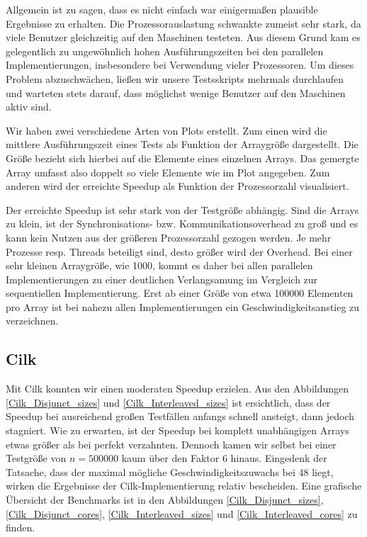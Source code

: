 Allgemein ist zu sagen, dass es nicht einfach war einigermaßen plausible Ergebnisse zu erhalten.
Die Prozessorauslastung schwankte zumeist sehr stark, da viele Benutzer gleichzeitig auf den Maschinen testeten.
Aus diesem Grund kam es gelegentlich zu ungewöhnlich hohen Ausführungszeiten bei den parallelen Implementierungen, insbesondere bei Verwendung vieler Prozessoren.
Um dieses Problem abzuschwächen, ließen wir unsere Testsskripts mehrmals durchlaufen und warteten stets darauf, dass möglichst wenige Benutzer auf den Maschinen aktiv sind.

Wir haben zwei verschiedene Arten von Plots erstellt.
Zum einen wird die mittlere Ausführungszeit eines Tests als Funktion der Arraygröße dargestellt.
Die Größe bezieht sich hierbei auf die Elemente eines einzelnen Arrays.
Das gemergte Array umfasst also doppelt so viele Elemente wie im Plot angegeben.
Zum anderen wird der erreichte Speedup als Funktion der Prozessorzahl visualisiert.

Der erreichte Speedup ist sehr stark von der Testgröße abhängig.
Sind die Arrays zu klein, ist der Synchronisations- bzw. Kommunikationsoverhead zu groß und es kann kein Nutzen aus der größeren Prozessorzahl gezogen werden.
Je mehr Prozesse resp. Threads beteiligt sind, desto größer wird der Overhead.
Bei einer sehr kleinen Arraygröße, wie 1000, kommt es daher bei allen parallelen Implementierungen zu einer deutlichen Verlangsamung im Vergleich zur sequentiellen Implementierung.
Erst ab einer Größe von etwa 100000 Elementen pro Array ist bei nahezu allen Implementierungen ein Geschwindigkeitsanstieg zu verzeichnen. 


\subsection{Cilk}
Mit Cilk konnten wir einen moderaten Speedup erzielen.
Aus den Abbildungen \ref{Cilk_Disjunct_sizes} und \ref{Cilk_Interleaved_sizes} ist ersichtlich, dass der Speedup bei ausreichend großen Testfällen anfangs schnell ansteigt, dann jedoch stagniert.
Wie zu erwarten, ist der Speedup bei komplett unabhängigen Arrays etwas größer als bei perfekt verzahnten.
Dennoch kamen wir selbst bei einer Testgröße von $n = 500000$ kaum über den Faktor 6 hinaus.
Eingedenk der Tatsache, dass der maximal mögliche Geschwindigkeitszuwachs bei 48 liegt, wirken die Ergebnisse der Cilk-Implementierung relativ bescheiden.
Eine grafische Übersicht der Benchmarks ist in den Abbildungen \ref{Cilk_Disjunct_sizes}, \ref{Cilk_Disjunct_cores}, \ref{Cilk_Interleaved_sizes} und \ref{Cilk_Interleaved_cores} zu finden.


